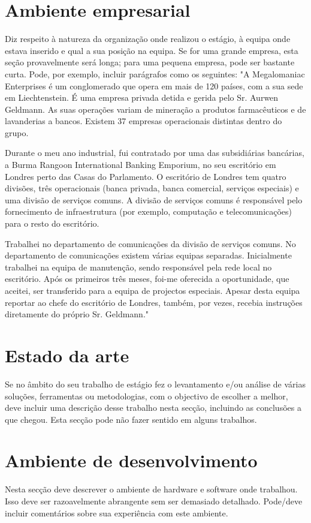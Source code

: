 \documentclass{article}
\begin{document}
\section{Ambiente empresarial}
Diz respeito à natureza da organização onde realizou o estágio, à equipa onde estava inserido e qual a sua posição na equipa. Se for uma grande empresa, esta seção provavelmente será longa; para uma pequena empresa, pode ser bastante curta. Pode, por exemplo, incluir parágrafos como os seguintes:
"A Megalomaniac Enterprises é um conglomerado que opera em mais de 120 países, com a sua sede em Liechtenstein. É uma empresa privada detida e gerida pelo Sr. Aurwen Geldmann. As suas operações variam de mineração a produtos farmacêuticos e de lavanderias a bancos. Existem 37 empresas operacionais distintas dentro do grupo.

Durante o meu ano industrial, fui contratado por uma das subsidiárias bancárias, a Burma Rangoon International Banking Emporium, no seu escritório em Londres perto das Casas do Parlamento. O escritório de Londres tem quatro divisões, três operacionais (banca privada, banca comercial, serviços especiais) e uma divisão de serviços comuns. A divisão de serviços comuns é responsável pelo fornecimento de infraestrutura (por exemplo, computação e telecomunicações) para o resto do escritório. 

Trabalhei no departamento de comunicações da divisão de serviços comuns. No departamento de comunicações existem várias equipas separadas. Inicialmente trabalhei na equipa de manutenção, sendo responsável pela rede local no escritório. Após os primeiros três meses, foi-me oferecida a oportunidade, que aceitei, ser transferido  para a equipa de projectos especiais. Apesar desta equipa reportar ao chefe do escritório de Londres, também, por vezes, recebia instruções diretamente do próprio Sr. Geldmann."


\cleardoublepage
\section{Estado da arte}
Se no âmbito do seu trabalho de estágio fez o levantamento e/ou análise de várias soluções, ferramentas ou metodologias, com o objectivo de escolher a melhor, deve incluir uma descrição desse trabalho nesta secção, incluindo as conclusões a que chegou.
Esta secção pode não fazer sentido em alguns trabalhos.


\cleardoublepage
\section{Ambiente de desenvolvimento}
Nesta secção deve descrever o ambiente de hardware e software onde trabalhou. Isso deve ser razoavelmente abrangente sem ser demasiado detalhado. Pode/deve incluir comentários sobre sua experiência com este ambiente.
\end{document}
